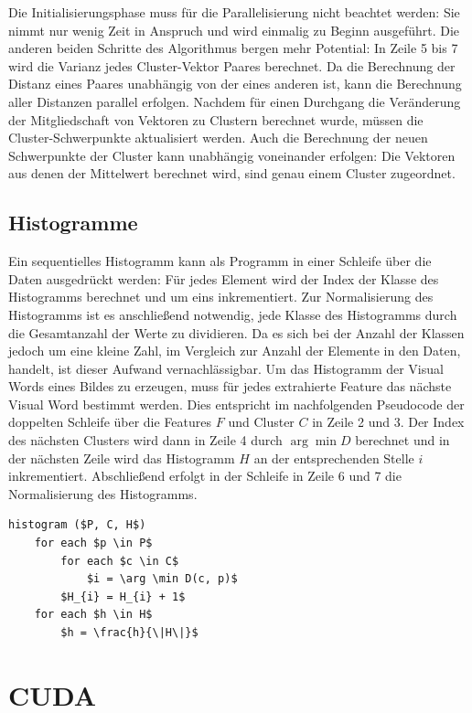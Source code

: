 Die Initialisierungsphase muss für die Parallelisierung nicht beachtet werden: Sie nimmt nur wenig Zeit in Anspruch und wird einmalig zu Beginn ausgeführt. Die anderen beiden Schritte des Algorithmus bergen mehr Potential: In Zeile 5 bis 7 wird die Varianz jedes Cluster-Vektor Paares berechnet. Da die Berechnung der Distanz eines Paares unabhängig von der eines anderen ist, kann die Berechnung aller Distanzen parallel erfolgen. Nachdem für einen Durchgang die Veränderung der Mitgliedschaft von Vektoren zu Clustern berechnet wurde, müssen die Cluster-Schwerpunkte aktualisiert werden. Auch die Berechnung der neuen Schwerpunkte der Cluster kann unabhängig voneinander erfolgen: Die Vektoren aus denen der Mittelwert berechnet wird, sind genau einem Cluster zugeordnet.

\subsection{Histogramme}

Ein sequentielles Histogramm kann als Programm in einer Schleife über die Daten ausgedrückt werden: Für jedes Element wird der Index der Klasse des Histogramms berechnet und um eins inkrementiert. Zur Normalisierung des Histogramms ist es anschließend notwendig, jede Klasse des Histogramms durch die Gesamtanzahl der Werte zu dividieren. Da es sich bei der Anzahl der Klassen jedoch um eine kleine Zahl, im Vergleich zur Anzahl der Elemente in den Daten, handelt, ist dieser Aufwand vernachlässigbar.
Um das Histogramm der Visual Words eines Bildes zu erzeugen, muss für jedes extrahierte Feature das nächste Visual Word bestimmt werden. Dies entspricht im nachfolgenden Pseudocode der doppelten Schleife über die Features $F$ und Cluster $C$ in Zeile 2 und 3. Der Index des nächsten Clusters wird dann in Zeile 4 durch $\arg \min D$ berechnet und in der nächsten Zeile wird das Histogramm $H$ an der entsprechenden Stelle $i$ inkrementiert. Abschließend erfolgt in der Schleife in Zeile 6 und 7 die Normalisierung des Histogramms.

\begin{lstlisting}[mathescape=true]
histogram ($P, C, H$)
	for each $p \in P$
		for each $c \in C$
			$i = \arg \min D(c, p)$ 
		$H_{i} = H_{i} + 1$		
	for each $h \in H$
		$h = \frac{h}{\|H\|}$
\end{lstlisting}

\section{CUDA}

